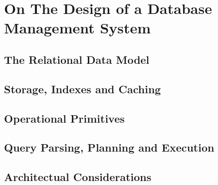 \chapter{On The Design of a Database Management System}
\label{chapter:theory_databases}


\section{The Relational Data Model}

\section{Storage, Indexes and Caching}

\section{Operational Primitives}

\section{Query Parsing, Planning and Execution}

\section{Architectual Considerations}